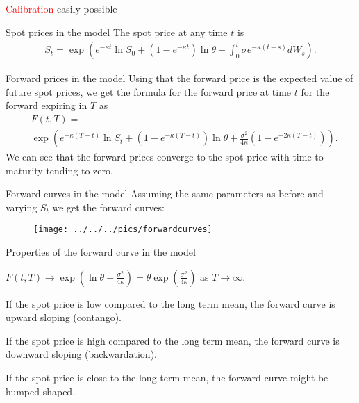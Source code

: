 {	\textcolor{red}{Calibration} easily possible







{Spot prices in the model}
The spot price at any time $t$ is
\begin{align*}
	S_t = \exp \left( e^{-\kappa t} \ln S_0 + (1-e^{-\kappa t}) \ln \theta + \int_0^t{\sigma e^{-\kappa (t-s)}}dW_s \right).
\end{align*}

{Forward prices in the model}
Using that the forward price is the expected value of future spot prices,
we get the formula for the forward price at time $t$ for the forward expiring in $T$ as
\begin{align*}
	&F(t,T) = \\
	&\exp \left( e^{-\kappa(T-t)} \ln S_t + (1-e^{-\kappa(T-t)}) \ln \theta + \frac{\sigma^2}{4\kappa}(1-e^{-2\kappa(T-t)}) \right).
\end{align*}
We can see that the forward prices converge to the spot price with time to maturity tending to zero.

{Forward curves in the model}
Assuming the same parameters as before and varying $S_t$ we get the forward curves:
\begin{figure}
	\centering
		\texttt{[image: ../../../pics/forwardcurves]}
	\label{fig:forwardcurves}
\end{figure}

{Properties of the forward curve in the model}






	$F(t,T) \rightarrow \exp(\ln \theta + \frac{\sigma^2}{4 \kappa}) = \theta \exp{(\frac{\sigma^2}{4\kappa})}$ as $T \rightarrow \infty$.

	If the spot price is low compared to the long term mean, the forward curve is upward sloping (contango).

	If the spot price is high compared to the long term mean, the forward curve is downward sloping (backwardation).

	If the spot price is close to the long term mean, the forward curve might be humped-shaped.



}
